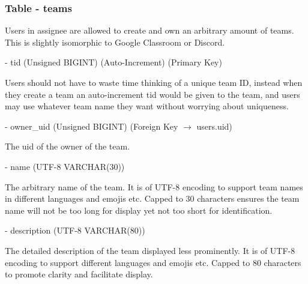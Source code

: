\documentclass[12pt]{report}
\newcommand{\n}{\par}
\newcommand{\br}{\n\vspace{1 em}\n}
\begin{document}
\subsubsection{Table - teams} \label{data-layer.design.team-system.teams}
Users in assignee are allowed to create and own an arbitrary amount of teams.
This is slightly isomorphic to Google Classroom or Discord.
\br
- tid (Unsigned BIGINT) (Auto-Increment) (Primary Key)\n
Users should not have to waste time thinking of a unique team ID,
instead when they create a team an auto-increment tid would be given to the team,
and users may use whatever team name they want without worrying about uniqueness.
\br
- owner\_uid (Unsigned BIGINT) (Foreign Key $\rightarrow$ users.uid)\n
The uid of the owner of the team.
\br
- name (UTF-8 VARCHAR(30))\n
The arbitrary name of the team.
It is of UTF-8 encoding to support team names in different languages and emojis etc.
Capped to 30 characters ensures the team name will not be too long for display yet not too short for identification.
\br
- description (UTF-8 VARCHAR(80))\n
The detailed description of the team displayed less prominently.
It is of UTF-8 encoding to support different languages and emojis etc.
Capped to 80 characters to promote clarity and facilitate display.
\end{document}
